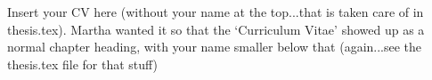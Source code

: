 \thispagestyle{myheadings}

Insert your CV here (without your name at the top...that is taken care of in thesis.tex).  Martha wanted it so that the `Curriculum Vitae' showed up as a normal chapter heading, with your name smaller below that (again...see the thesis.tex file for that stuff)